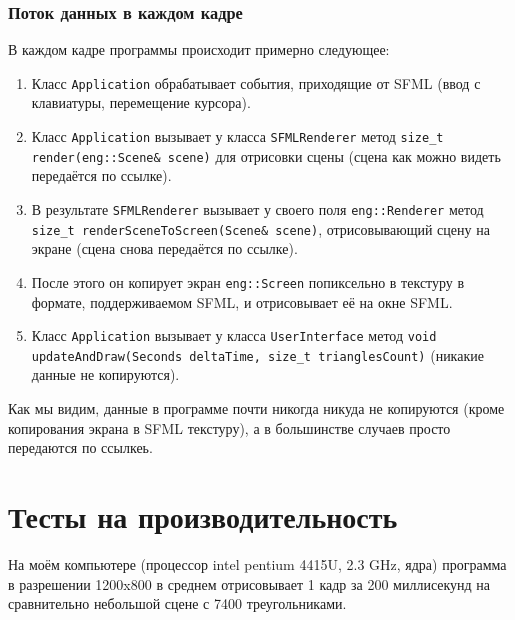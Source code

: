 \documentclass{article}
\begin{document}
\subsubsection{Поток данных в каждом кадре}
В каждом кадре программы происходит примерно следующее:
\begin{enumerate}
	\item Класс \texttt{Application} обрабатывает события, приходящие от SFML (ввод с клавиатуры, перемещение курсора).
	\item Класс \texttt{Application} вызывает у класса \texttt{SFMLRenderer} метод \texttt{size_t render(eng::Scene& scene)} для отрисовки сцены (сцена как можно видеть передаётся по ссылке).
	\item В результате \texttt{SFMLRenderer} вызывает у своего поля \texttt{eng::Renderer} метод \texttt{size_t renderSceneToScreen(Scene& scene)}, отрисовывающий сцену на экране (сцена снова передаётся по ссылке).
	\item После этого он копирует экран \texttt{eng::Screen} попиксельно в текстуру в формате, поддерживаемом SFML, и отрисовывает её на окне SFML.
	\item Класс \texttt{Application} вызывает у класса \texttt{UserInterface} метод \texttt{void updateAndDraw(Seconds deltaTime, size_t trianglesCount)} (никакие данные не копируются).
\end{enumerate}

Как мы видим, данные в программе почти никогда никуда не копируются (кроме копирования экрана в SFML текстуру), а в большинстве случаев просто передаются по ссылкеь.

\section{Тесты на производительность}
На моём компьютере (процессор intel pentium 4415U, 2.3 GHz,  ядра) программа в разрешении 1200x800 в среднем отрисовывает 1 кадр за 200 миллисекунд на сравнительно небольшой сцене с 7400 треугольниками.

\pagebreak





\end{document}
